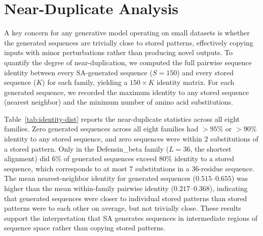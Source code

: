 \documentclass[10pt]{article}
\begin{document}
\section{Near-Duplicate Analysis}\label{si:identity-distribution}

A key concern for any generative model operating on small datasets is whether the generated sequences are trivially close to stored patterns, effectively copying inputs with minor perturbations rather than producing novel outputs. To quantify the degree of near-duplication, we computed the full pairwise sequence identity between every SA-generated sequence ($S{=}150$) and every stored sequence ($K$) for each family, yielding a $150 \times K$ identity matrix. For each generated sequence, we recorded the maximum identity to any stored sequence (nearest neighbor) and the minimum number of amino acid substitutions.

Table~\ref{tab:identity-dist} reports the near-duplicate statistics across all eight families. Zero generated sequences across all eight families had $>95\%$ or $>90\%$ identity to any stored sequence, and zero sequences were within 2 substitutions of a stored pattern. Only in the Defensin\_beta family ($L{=}36$, the shortest alignment) did $6\%$ of generated sequences exceed $80\%$ identity to a stored sequence, which corresponds to at most 7 substitutions in a 36-residue sequence. The mean nearest-neighbor identity for generated sequences ($0.515$--$0.655$) was higher than the mean within-family pairwise identity ($0.217$--$0.368$), indicating that generated sequences were closer to individual stored patterns than stored patterns were to each other on average, but not trivially close. These results support the interpretation that SA generates sequences in intermediate regions of sequence space rather than copying stored patterns.
\end{document}

